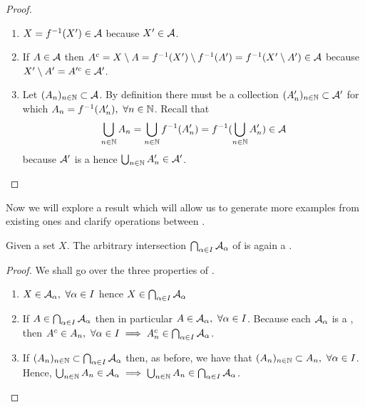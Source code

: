 \begin{eg}
\begin{enumerate}
		\begin{proof}
			\begin{enumerate}
				\item $X = f^{-1}(X') \in \mathcal{A}$ because $X' \in \mathcal{A}$.
				\item If $A \in \mathcal{A}$ then $A^c = X \setminus A = f^{-1}(X')\setminus f^{-1} (A') = f^{-1}(X' \setminus A') \in \mathcal{A}$ because $X' \setminus A' = A'^c \in \mathcal{A}'$.
				\item Let $(A_n)_{n \in \mathbb{N}} \subset \mathcal{A}$. By definition there must be a collection $(A_n')_{n \in \mathbb{N}} \subset \mathcal{A}'$ for which $A_n = f^{-1}(A_n'),\ \forall n \in \mathbb{N}$. Recall that
				\begin{align*}
					\bigcup_{n \in \mathbb{N}} A_n = \bigcup_{n \in \mathbb{N}} f^{-1}(A_n') = f^{-1} (\bigcup_{n \in \mathbb{N}} A_n') \in \mathcal{A}
				\end{align*} because $\mathcal{A}'$ is a \siga hence $\bigcup_{n \in \mathbb{N}} A_n' \in \mathcal{A}'$.
			\end{enumerate}
		\end{proof}
	\end{enumerate}
\end{eg}

Now we will explore a result which will allow us to generate more examples from existing ones and clarify operations between \sigas.

\begin{thm}
	Given a set $X$. The arbitrary intersection $\bigcap_{\alpha \in I} \mathcal{A}_\alpha$ of \sigas is again a \siga.
\end{thm}

\begin{proof}
	We shall go over the three properties of \sigas.
	\begin{enumerate}
		\item $X \in \mathcal{A}_\alpha,\ \forall \alpha \in I$ hence $X \in \bigcap_{\alpha \in I} \mathcal{A}_\alpha$
		\item If $A \in \bigcap_{\alpha \in I} \mathcal{A}_\alpha$ then in particular $A \in \mathcal{A}_\alpha,\ \forall \alpha \in I$. Because each $\mathcal{A}_\alpha$ is a \siga, then $A^c \in A_n,\ \forall \alpha \in I \implies A_n^c \in \bigcap_{\alpha \in I} \mathcal{A}_\alpha$.
		\item If $(A_n)_{n\in \mathbb{N}} \subset \bigcap_{\alpha \in I} \mathcal{A}_\alpha$ then, as before, we have that $(A_n)_{n \in \mathbb{N}} \subset A_n,\ \forall \alpha \in I$. Hence, $\bigcup_{n \in \mathbb{N}} A_n \in \mathcal{A}_\alpha \implies \bigcup_{n \in \mathbb{N}} A_n \in \bigcap_{\alpha \in I} \mathcal{A}_\alpha$.
	\end{enumerate}
\end{proof}


